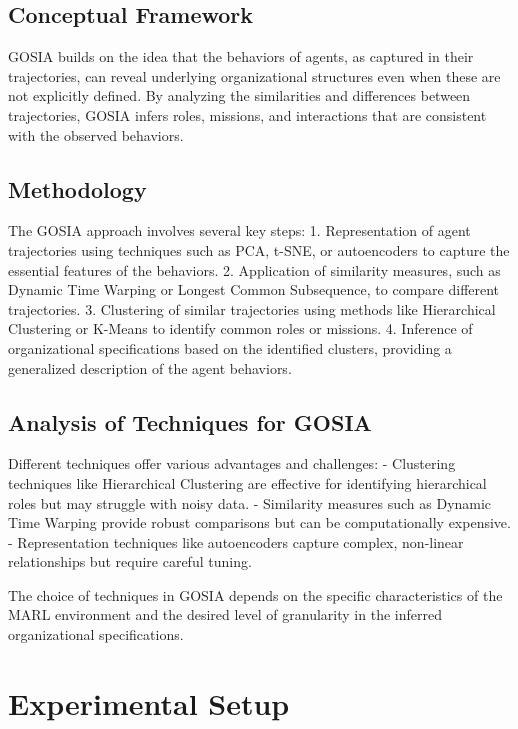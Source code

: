 \documentclass[sn-mathphys-num]{sn-jnl}%
\theoremstyle{thmstyleone}%
\theoremstyle{thmstyletwo}%
\theoremstyle{thmstylethree}%
\begin{document}
\subsection{Conceptual Framework}

GOSIA builds on the idea that the behaviors of agents, as captured in their trajectories, can reveal underlying organizational structures even when these are not explicitly defined. By analyzing the similarities and differences between trajectories, GOSIA infers roles, missions, and interactions that are consistent with the observed behaviors.

\subsection{Methodology}

The GOSIA approach involves several key steps:
1. Representation of agent trajectories using techniques such as PCA, t-SNE, or autoencoders to capture the essential features of the behaviors.
2. Application of similarity measures, such as Dynamic Time Warping or Longest Common Subsequence, to compare different trajectories.
3. Clustering of similar trajectories using methods like Hierarchical Clustering or K-Means to identify common roles or missions.
4. Inference of organizational specifications based on the identified clusters, providing a generalized description of the agent behaviors.

\subsection{Analysis of Techniques for GOSIA}

Different techniques offer various advantages and challenges:
- Clustering techniques like Hierarchical Clustering are effective for identifying hierarchical roles but may struggle with noisy data.
- Similarity measures such as Dynamic Time Warping provide robust comparisons but can be computationally expensive.
- Representation techniques like autoencoders capture complex, non-linear relationships but require careful tuning.

The choice of techniques in GOSIA depends on the specific characteristics of the MARL environment and the desired level of granularity in the inferred organizational specifications.

\section{Experimental Setup}
\label{sec:experiment}
\end{document}
